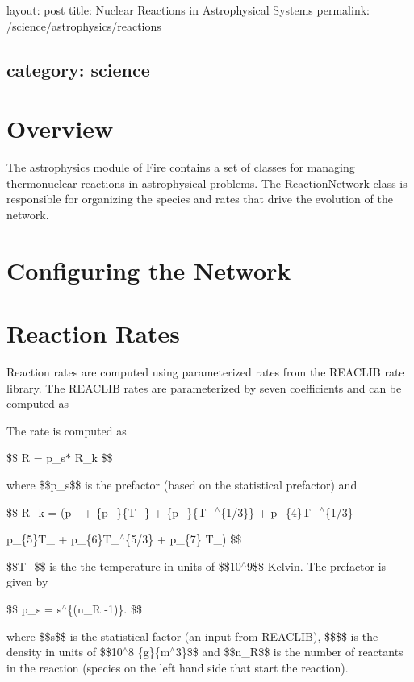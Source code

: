 

 layout\+: post title\+: Nuclear Reactions in Astrophysical Systems permalink\+: /science/astrophysics/reactions \subsection*{category\+: science }

\section*{Overview}

The astrophysics module of Fire contains a set of classes for managing thermonuclear reactions in astrophysical problems. The Reaction\+Network class is responsible for organizing the species and rates that drive the evolution of the network.

\section*{Configuring the Network}

\section*{Reaction Rates}

Reaction rates are computed using parameterized rates from the R\+E\+A\+C\+L\+IB rate library. The R\+E\+A\+C\+L\+IB rates are parameterized by seven coefficients and can be computed as

The rate is computed as

\$\$ R = p\+\_\+s$\ast$ R\+\_\+k \$\$

where \$\$p\+\_\+s\$\$ is the prefactor (based on the statistical prefactor) and

\$\$ R\+\_\+k = (p\+\_ + \{p\+\_\}\{T\+\_\} + \{p\+\_\}\{T\+\_$^\wedge$\{1/3\}\} + p\+\_\+\{4\}T\+\_$^\wedge$\{1/3\}
\begin{DoxyItemize}
\item p\+\_\+\{5\}T\+\_ + p\+\_\+\{6\}T\+\_$^\wedge$\{5/3\} + p\+\_\+\{7\} T\+\_) \$\$
\end{DoxyItemize}

\$\$\+T\+\_\$\$ is the the temperature in units of \$\$10$^\wedge$9\$\$ Kelvin. The prefactor is given by

\$\$ p\+\_\+s = s$^\wedge$\{(n\+\_\+R -\/1)\}. \$\$

where \$\$s\$\$ is the statistical factor (an input from R\+E\+A\+C\+L\+IB), \$\$\$\$ is the density in units of \$\$10$^\wedge$8 \{g\}\{m$^\wedge$3\}\$\$ and \$\$n\+\_\+R\$\$ is the number of reactants in the reaction (species on the left hand side that start the reaction).

